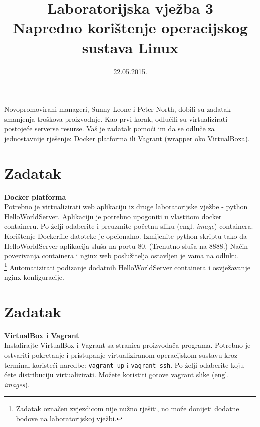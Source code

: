 \documentclass[12pt,a4paper]{article}
\begin{document}
	\title{Laboratorijska vježba 3\\{\large Napredno korištenje operacijskog sustava Linux}}
	\date{\vspace{-5ex} 22.05.2015.}
	\maketitle
	
        Novopromovirani manageri, Sunny Leone i Peter North, dobili su zadatak smanjenja troškova proizvodnje. Kao prvi korak, odlučili su virtualizirati postojeće serverse resurse. Vaš je zadatak pomoći im da se odluče za jednostavnije rješenje: Docker platforma ili Vagrant (wrapper oko VirtualBoxa).
        
	
	\section*{Zadatak}
	
        \textbf{Docker platforma} \\
        
        Potrebno je virtualizirati web aplikaciju iz druge laboratorijske vježbe - python HelloWorldServer. Aplikaciju je potrebno upogoniti u vlastitom docker containeru. Po želji odaberite i preuzmite početnu sliku (engl. \textit{image}) containera. Korištenje Dockerfile datoteke je opcionalno. Izmijenite python skriptu tako da HelloWorldServer aplikacija sluša na portu 80. (Trenutno sluša na 8888.) Način povezivanja containera i nginx web poslužitelja ostavljen je vama na odluku.\\
        
        \footnote[1]{Zadatak označen zvjezdicom nije nužno rješiti, no može donijeti dodatne bodove na laboratorijskoj vježbi.} Automatizirati podizanje dodatnih HelloWorldServer containera i osvježavanje nginx konfiguracije.

    \section*{Zadatak}

        \textbf{VirtualBox i Vagrant} \\

        Instalirajte VirtualBox i Vagrant sa stranica proizvođača programa. Potrebno je ostvariti pokretanje i pristupanje virtualiziranom operacijskom sustavu kroz terminal koristeći naredbe: \texttt{vagrant up} i \texttt{vagrant ssh}. Po želji odaberite koju ćete distribuciju virtualizirati. Možete koristiti gotove vagrant slike (engl. \textit{images}).
        
\end{document}
